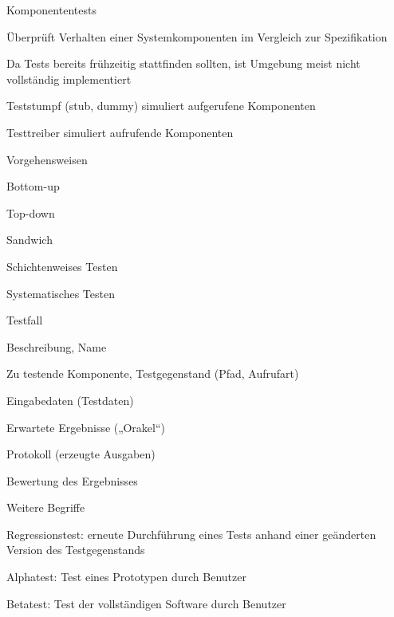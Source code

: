 \documentclass[a4paper]{article}
\begin{document}
\begin{multicols}{3}
  Komponententests
  \begin{itemize*}
    \item Überprüft Verhalten einer Systemkomponenten im Vergleich zur Spezifikation
    \item Da Tests bereits frühzeitig stattfinden sollten, ist Umgebung meist nicht vollständig implementiert
          \begin{itemize*}
            \item Teststumpf (stub, dummy) simuliert aufgerufene Komponenten
            \item Testtreiber simuliert aufrufende Komponenten
          \end{itemize*}
    \item Vorgehensweisen
          \begin{itemize*}
            \item Bottom-up
            \item Top-down
            \item Sandwich
            \item Schichtenweises Testen
          \end{itemize*}
  \end{itemize*}

  Systematisches Testen
  \begin{itemize*}
    \item Testfall
          \begin{itemize*}
            \item Beschreibung, Name
            \item Zu testende Komponente, Testgegenstand (Pfad, Aufrufart)
            \item Eingabedaten (Testdaten)
            \item Erwartete Ergebnisse („Orakel“)
            \item Protokoll (erzeugte Ausgaben)
            \item Bewertung des Ergebnisses
          \end{itemize*}
    \item Weitere Begriffe
          \begin{itemize*}
            \item Regressionstest: erneute Durchführung eines Tests anhand einer geänderten Version des Testgegenstands
            \item Alphatest: Test eines Prototypen durch Benutzer
            \item Betatest: Test der vollständigen Software durch Benutzer
          \end{itemize*}
  \end{itemize*}


\end{multicols}
\end{document}
